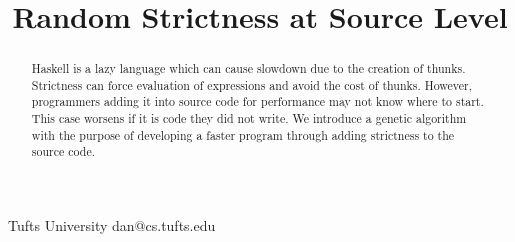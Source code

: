 \documentclass[preprint,nocopyrightspace]{sigplanconf}
\begin{document}
\lstset{language=Haskell,basicstyle=\ttfamily,captionpos=b}

\setlength{\pdfpageheight}{\paperheight}
\setlength{\pdfpagewidth}{\paperwidth}





\title{Random Strictness at Source Level}

           {Tufts University}
           {dan@cs.tufts.edu}

\maketitle
\thispagestyle{plain}
\pagestyle{plain}
\begin{abstract}
Haskell is a lazy language which can cause slowdown due to the creation of thunks. Strictness can force evaluation of expressions and avoid the cost of thunks. However, programmers adding it into source code for performance may not know where to start. This case worsens if it is code they did not write. We introduce a genetic algorithm with the purpose of developing a faster program through adding strictness to the source code.
\end{abstract}



\end{document}
